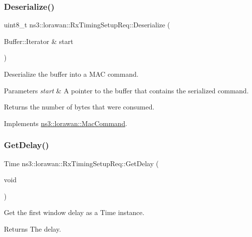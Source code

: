 \subsubsection{\texorpdfstring{Deserialize()}{Deserialize()}}
{\footnotesize\ttfamily uint8\+\_\+t ns3\+::lorawan\+::\+Rx\+Timing\+Setup\+Req\+::\+Deserialize (\begin{DoxyParamCaption}\item[{Buffer\+::\+Iterator \&}]{start }\end{DoxyParamCaption})\hspace{0.3cm}{\ttfamily [virtual]}}

Deserialize the buffer into a M\+AC command.


\begin{DoxyParams}{Parameters}
{\em start} & A pointer to the buffer that contains the serialized command. \\
\hline
\end{DoxyParams}
\begin{DoxyReturn}{Returns}
the number of bytes that were consumed. 
\end{DoxyReturn}


Implements \hyperlink{classns3_1_1lorawan_1_1MacCommand_af12d223a71a67196bce498f1240eda75}{ns3\+::lorawan\+::\+Mac\+Command}.

\mbox{\label{classns3_1_1lorawan_1_1RxTimingSetupReq_ae9c9dcc8cb7fad96159ca8af53e4db32}} 
\subsubsection{\texorpdfstring{Get\+Delay()}{GetDelay()}}
{\footnotesize\ttfamily Time ns3\+::lorawan\+::\+Rx\+Timing\+Setup\+Req\+::\+Get\+Delay (\begin{DoxyParamCaption}\item[{void}]{ }\end{DoxyParamCaption})}

Get the first window delay as a Time instance.

\begin{DoxyReturn}{Returns}
The delay. 
\end{DoxyReturn}
\mbox{\label{classns3_1_1lorawan_1_1RxTimingSetupReq_a8fa4e7482550477e2a5a2193e8429b69}} 
